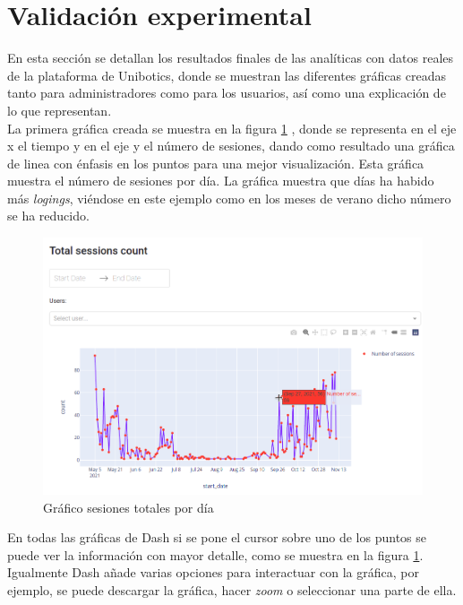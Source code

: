 \section{Validación experimental}

En esta sección se detallan los resultados finales de las analíticas con datos reales de la plataforma de Unibotics, donde se muestran las diferentes gráficas creadas tanto para administradores como para los usuarios, así como una explicación de lo que representan.\\

La primera gráfica creada se muestra en la figura \ref{fig:sesion} , donde se representa en el eje x el tiempo y en el eje y el número de sesiones, dando como resultado una gráfica de linea con énfasis en los puntos para una mejor visualización. Esta gráfica muestra el número de sesiones por día. La gráfica muestra que días ha habido más \textit{logings}, viéndose en este ejemplo como en los meses de verano dicho número se ha reducido.



\begin{figure}[H]
    \centering
    \includegraphics[width=18cm, keepaspectratio]{img/sesion.png}
    \caption{Gráfico sesiones totales por día}
    \label{fig:sesion}
\end{figure}
\newpage
En todas las gráficas de Dash si se pone el cursor sobre uno de los puntos se puede ver la información con mayor detalle, como se muestra en la figura \ref{fig:sesion}. Igualmente Dash añade varias opciones para interactuar con la gráfica, por ejemplo, se puede descargar la gráfica, hacer \textit{zoom} o seleccionar una parte de ella. \\

